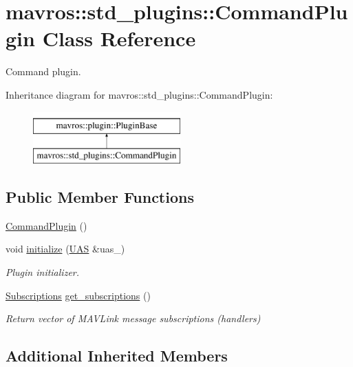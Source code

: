 \hypertarget{classmavros_1_1std__plugins_1_1CommandPlugin}{}\section{mavros\+::std\+\_\+plugins\+::Command\+Plugin Class Reference}
\label{classmavros_1_1std__plugins_1_1CommandPlugin}


Command plugin.  


Inheritance diagram for mavros\+::std\+\_\+plugins\+::Command\+Plugin\+:\begin{figure}[H]
\begin{center}
\leavevmode
\includegraphics[height=2.000000cm]{classmavros_1_1std__plugins_1_1CommandPlugin}
\end{center}
\end{figure}
\subsection*{Public Member Functions}
\begin{DoxyCompactItemize}
\item 
\mbox{\hyperlink{group__plugin_ga940a7bdc408198dd8571ee68b095b0f2}{Command\+Plugin}} ()
\item 
void \mbox{\hyperlink{group__plugin_ga4093176dbbf2e0118a02d423d19f9faf}{initialize}} (\mbox{\hyperlink{classmavros_1_1UAS}{U\+AS}} \&uas\+\_\+)
\begin{DoxyCompactList}\small\item\em Plugin initializer. \end{DoxyCompactList}\item 
\mbox{\hyperlink{group__plugin_ga8967d61fc77040e0c3ea5a4585d62a09}{Subscriptions}} \mbox{\hyperlink{group__plugin_ga359b17302f8aac303c17013d6fe7ea7f}{get\+\_\+subscriptions}} ()
\begin{DoxyCompactList}\small\item\em Return vector of M\+A\+V\+Link message subscriptions (handlers) \end{DoxyCompactList}\end{DoxyCompactItemize}
\subsection*{Additional Inherited Members}


